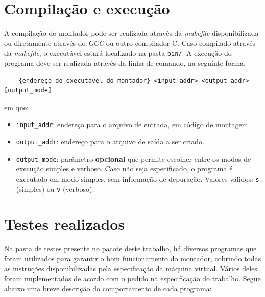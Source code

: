 \documentclass[10pt,a4paper]{article}
\numberwithin{equation}{section}
\begin{document}
\section{Compilação e execução}

A compilação do montador pode ser realizada através da \emph{makefile} disponibilizada ou diretamente através do \emph{GCC} ou outro compilador C. Caso compilado através da \emph{makefile}, o executável estará localizado na pasta \verb|bin/|. A execução do programa deve ser realizada através da linha de comando, na seguinte forma,

\begin{verbatim}
    {endereço do executável do montador} <input_addr> <output_addr> [output_mode]
\end{verbatim}

em que:

\begin{itemize}
    \item \verb|input_addr|: endereço para o arquivo de entrada, em código de montagem.
    \item \verb|output_addr|: endereço para o arquivo de saída a ser criado.
    \item \verb|output_mode|: parâmetro \textbf{opcional} que permite escolher entre os modos de execução simples e verboso. Caso não seja especificado, o programa é executado em modo simples, sem informação de depuração. Valores válidos: \verb|s| (simples) ou \verb|v| (verboso).
\end{itemize}

\section{Testes realizados}

Na pasta de testes presente no pacote deste trabalho, há diversos programas que foram utilizados para garantir o bom funcionamento do montador, cobrindo todas as instruções disponibilizadas pela especificação da máquina virtual. Vários deles foram implementados de acordo com o pedido na especificação do trabalho. Segue abaixo uma breve descrição do comportamento de cada programa:
\end{document}
